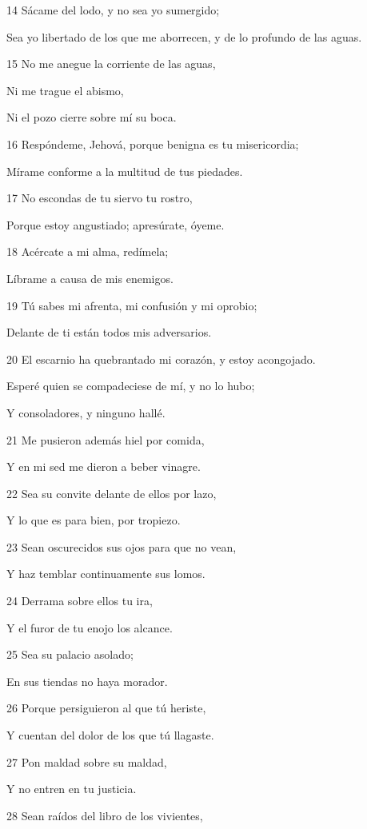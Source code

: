 \par 14 Sácame del lodo, y no sea yo sumergido;
\par Sea yo libertado de los que me aborrecen, y de lo profundo de las aguas.
\par 15 No me anegue la corriente de las aguas,
\par Ni me trague el abismo,
\par Ni el pozo cierre sobre mí su boca.
\par 16 Respóndeme, Jehová, porque benigna es tu misericordia;
\par Mírame conforme a la multitud de tus piedades.
\par 17 No escondas de tu siervo tu rostro,
\par Porque estoy angustiado; apresúrate, óyeme.
\par 18 Acércate a mi alma, redímela;
\par Líbrame a causa de mis enemigos.
\par 19 Tú sabes mi afrenta, mi confusión y mi oprobio;
\par Delante de ti están todos mis adversarios.
\par 20 El escarnio ha quebrantado mi corazón, y estoy acongojado.
\par Esperé quien se compadeciese de mí, y no lo hubo;
\par Y consoladores, y ninguno hallé.
\par 21 Me pusieron además hiel por comida,
\par Y en mi sed me dieron a beber vinagre.
\par 22 Sea su convite delante de ellos por lazo,
\par Y lo que es para bien, por tropiezo.
\par 23 Sean oscurecidos sus ojos para que no vean,
\par Y haz temblar continuamente sus lomos.
\par 24 Derrama sobre ellos tu ira,
\par Y el furor de tu enojo los alcance.
\par 25 Sea su palacio asolado;
\par En sus tiendas no haya morador.
\par 26 Porque persiguieron al que tú heriste,
\par Y cuentan del dolor de los que tú llagaste.
\par 27 Pon maldad sobre su maldad,
\par Y no entren en tu justicia.
\par 28 Sean raídos del libro de los vivientes,
